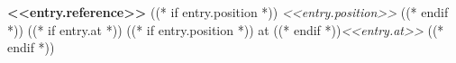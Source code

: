 {\textbf{<<entry.reference>>}}
{
    ((* if entry.position *))
    \textit{<<entry.position>>}
    ((* endif *))
    ((* if entry.at *))
    ((* if entry.position *)) at ((* endif *))\textit{<<entry.at>>}
    ((* endif *))
}{}{}